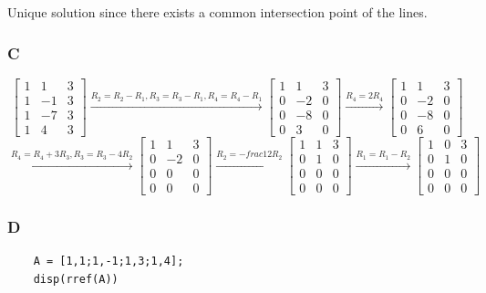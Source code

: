 \documentclass{article}
\begin{document}
Unique solution since there exists a common intersection point of the lines.

\subsubsection*{C}

\[
	\begin{bmatrix}
		1 & 1  & 3 \\
		1 & -1 & 3 \\
		1 & -7 & 3 \\
		1 & 4  & 3
	\end{bmatrix}
	\xrightarrow{R_2 = R_2 - R_1, R_3 = R_3 - R_1, R_4 = R_4 - R_1}
	\begin{bmatrix}
		1 & 1  & 3 \\
		0 & -2 & 0 \\
		0 & -8 & 0 \\
		0 & 3  & 0
	\end{bmatrix}
	\xrightarrow{R_4=2R_4}
	\begin{bmatrix}
		1 & 1  & 3 \\
		0 & -2 & 0 \\
		0 & -8 & 0 \\
		0 & 6  & 0
	\end{bmatrix}
\]
\[
	\xrightarrow{R_4=R_4+3R_3, R_3=R_3-4R_2}
	\begin{bmatrix}
		1 & 1  & 3 \\
		0 & -2 & 0 \\
		0 & 0  & 0 \\
		0 & 0  & 0
	\end{bmatrix}
	\xrightarrow{R_2=-frac{1}{2}R_2}
	\begin{bmatrix}
		1 & 1 & 3 \\
		0 & 1 & 0 \\
		0 & 0 & 0 \\
		0 & 0 & 0
	\end{bmatrix}
	\xrightarrow{R_1=R_1-R_2}
	\begin{bmatrix}
		1 & 0 & 3 \\
		0 & 1 & 0 \\
		0 & 0 & 0 \\
		0 & 0 & 0
	\end{bmatrix}
\]
\subsubsection*{D}


\begin{verbatim}
    A = [1,1;1,-1;1,3;1,4];
    disp(rref(A))
\end{verbatim}
\end{document}
